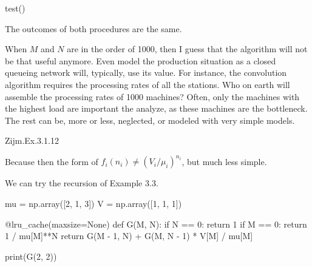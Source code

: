 \begin{exercise}
\begin{solution}
\begin{pyconsole}
test()
 
\end{pyconsole}

The outcomes of both procedures are the same. 

When $M$ and $N$ are in the order of 1000, then I guess that the
algorithm will not be that useful anymore. Even model the production
situation as a closed queueing network will, typically, use its
value. For instance, the convolution algorithm requires the processing
rates of all the stations. Who on earth will assemble the processing
rates of 1000 machines? Often, only the machines with the highest load
are important the analyze, as these machines are the bottleneck. The
rest can be, more or less, neglected, or modeled with very simple
models.

\end{solution}
\end{exercise}

\begin{exercise}
Zijm.Ex.3.1.12
\begin{solution}
 Because then the form of $f_i(n_i)\neq (V_i/\mu_i)^{n_i}$, but much
 less simple.

We can try the recursion of Example 3.3.

\begin{pyconsole}
mu = np.array([2, 1, 3])
V = np.array([1, 1, 1])


@lru_cache(maxsize=None)
def G(M, N):
 if N == 0:
 return 1
 if M == 0:
 return 1 / mu[M]**N
 return G(M - 1, N) + G(M, N - 1) * V[M] / mu[M]

print(G(2, 2))
 
\end{pyconsole}
\end{solution}
\end{exercise}









